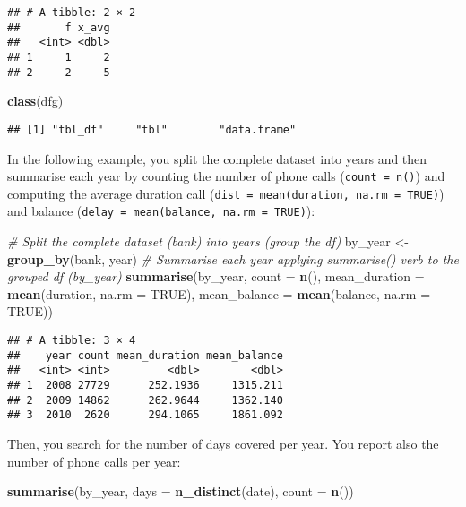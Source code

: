 \documentclass[]{book}
\newenvironment{Shaded}{\begin{snugshade}}{\end{snugshade}}
\newcommand{\KeywordTok}[1]{\textcolor[rgb]{0.13,0.29,0.53}{\textbf{{#1}}}}
\newcommand{\DataTypeTok}[1]{\textcolor[rgb]{0.13,0.29,0.53}{{#1}}}
\newcommand{\StringTok}[1]{\textcolor[rgb]{0.31,0.60,0.02}{{#1}}}
\newcommand{\CommentTok}[1]{\textcolor[rgb]{0.56,0.35,0.01}{\textit{{#1}}}}
\newcommand{\OtherTok}[1]{\textcolor[rgb]{0.56,0.35,0.01}{{#1}}}
\newcommand{\NormalTok}[1]{{#1}}
\begin{document}
\begin{verbatim}
## # A tibble: 2 × 2
##       f x_avg
##   <int> <dbl>
## 1     1     2
## 2     2     5
\end{verbatim}

\begin{Shaded}
\begin{Highlighting}[]
\KeywordTok{class}\NormalTok{(dfg)}
\end{Highlighting}
\end{Shaded}

\begin{verbatim}
## [1] "tbl_df"     "tbl"        "data.frame"
\end{verbatim}

In the following example, you split the complete dataset into years and
then summarise each year by counting the number of phone calls
(\texttt{count\ =\ n()}) and computing the average duration call
(\texttt{dist\ =\ mean(duration,\ na.rm\ =\ TRUE)}) and balance
(\texttt{delay\ =\ mean(balance,\ na.rm\ =\ TRUE)}):

\begin{Shaded}
\begin{Highlighting}[]
\CommentTok{# Split the complete dataset (bank) into years (group the df) }
\NormalTok{by_year <-}\StringTok{ }\KeywordTok{group_by}\NormalTok{(bank, year)}
\CommentTok{# Summarise each year applying summarise() verb to the grouped df (by_year)}
\KeywordTok{summarise}\NormalTok{(by_year,}
          \DataTypeTok{count =} \KeywordTok{n}\NormalTok{(),}
          \DataTypeTok{mean_duration =} \KeywordTok{mean}\NormalTok{(duration, }\DataTypeTok{na.rm =} \OtherTok{TRUE}\NormalTok{),}
          \DataTypeTok{mean_balance =} \KeywordTok{mean}\NormalTok{(balance, }\DataTypeTok{na.rm =} \OtherTok{TRUE}\NormalTok{))}
\end{Highlighting}
\end{Shaded}

\begin{verbatim}
## # A tibble: 3 × 4
##    year count mean_duration mean_balance
##   <int> <int>         <dbl>        <dbl>
## 1  2008 27729      252.1936     1315.211
## 2  2009 14862      262.9644     1362.140
## 3  2010  2620      294.1065     1861.092
\end{verbatim}

Then, you search for the number of days covered per year. You report
also the number of phone calls per year:

\begin{Shaded}
\begin{Highlighting}[]
\KeywordTok{summarise}\NormalTok{(by_year,}
          \DataTypeTok{days =} \KeywordTok{n_distinct}\NormalTok{(date),}
          \DataTypeTok{count =} \KeywordTok{n}\NormalTok{())}
\end{Highlighting}
\end{Shaded}
\end{document}
